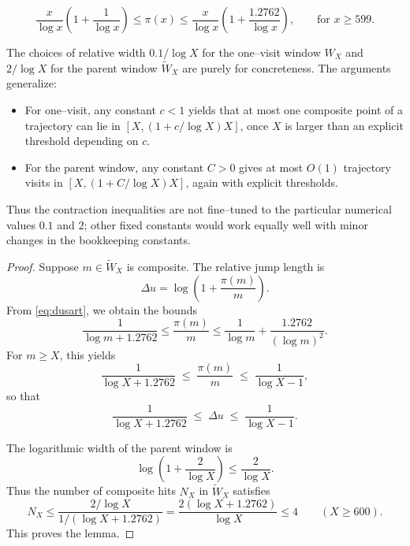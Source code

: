\documentclass[10pt,a4paper]{amsart}
\begin{document}
\begin{equation}\label{eq:dusart}
\frac{x}{\log x}\left(1 + \frac{1}{\log x}\right) \leq \pi(x) \leq \frac{x}{\log x}\left(1 + \frac{1.2762}{\log x}\right), \qquad \text{for } x \geq 599.
\end{equation}

\begin{remark}
The choices of relative width $0.1/\log X$ for the one--visit window $W_X$
and $2/\log X$ for the parent window $\widetilde W_X$ are purely for
concreteness. The arguments generalize:
\begin{itemize}
\item For one--visit, any constant $c<1$ yields that at most one composite
point of a trajectory can lie in $[X,(1+c/\log X)X]$, once $X$ is larger
than an explicit threshold depending on $c$.
\item For the parent window, any constant $C>0$ gives at most $O(1)$
trajectory visits in $[X,(1+C/\log X)X]$, again with explicit thresholds.
\end{itemize}
Thus the contraction inequalities are not fine--tuned to the particular
numerical values $0.1$ and $2$; other fixed constants would work equally
well with minor changes in the bookkeeping constants.
\end{remark}

\begin{proof}
Suppose $m\in \widetilde W_X$ is composite. The relative jump length is
\[
\Delta u = \log\!\left(1+\frac{\pi(m)}{m}\right).
\]
From \eqref{eq:dusart}, we obtain the bounds
\[
\frac{1}{\log m+1.2762} \leq \frac{\pi(m)}{m} \leq \frac{1}{\log m}+\frac{1.2762}{(\log m)^2}.
\]
For $m\geq X$, this yields
\[
\frac{1}{\log X+1.2762} \;\leq\; \frac{\pi(m)}{m} \;\leq\; \frac{1}{\log X-1},
\]
so that
\begin{equation}\label{eq:deltabounds}
\frac{1}{\log X+1.2762} \;\leq\; \Delta u \;\leq\; \frac{1}{\log X-1}.
\end{equation}

The logarithmic width of the parent window is
\[
\log\!\left(1+\frac{2}{\log X}\right) \leq \frac{2}{\log X}.
\]
Thus the number of composite hits $N_X$ in $\widetilde W_X$ satisfies
\[
N_X \leq \frac{2/\log X}{1/(\log X+1.2762)} = \frac{2(\log X+1.2762)}{\log X} \le 4\qquad (X\ge 600).
\]
This proves the lemma.
\end{proof}
\end{document}

